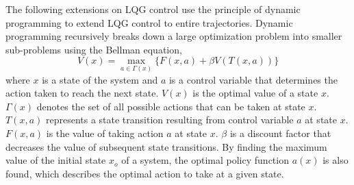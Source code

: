 \documentclass[12pt]{article}
\begin{document}
            The following extensions on LQG control use the principle of dynamic programming to extend LQG control to entire trajectories. Dynamic programming recursively breaks down a large optimization problem into smaller sub-problems using the Bellman equation,
            \begin{equation}
                V(x)=\max_{a \in \Gamma (x)}\{F(x,a)+\beta V(T(x,a))\}
            \end{equation}
            where $x$ is a state of the system and $a$ is a control variable that determines the action taken to reach the next state. $V(x)$ is the optimal value of a state $x$. $\Gamma(x)$ denotes the set of all possible actions that can be taken at state $x$. $T(x,a)$ represents a state transition resulting from control variable $a$ at state $x$. $F(x,a)$ is the value of taking action $a$ at state $x$. $\beta$ is a discount factor that decreases the value of subsequent state transitions. By finding the maximum value of the initial state $x_{o}$ of a system, the optimal policy function $a(x)$ is also found, which describes the optimal action to take at a given state.
\end{document}
